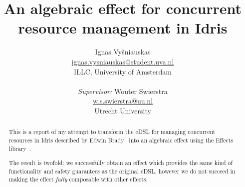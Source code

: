 \documentclass{article}
\title{An algebraic effect for concurrent resource management in Idris}
\author{Ignas Vyšniauskas \\ \url{ignas.vysniauskas@student.uva.nl} \\
        ILLC, University of Amsterdam \\
    \\ \textit{Supervisor:} Wouter Swierstra
    \\ \url{w.s.swierstra@uu.nl}
    \\ Utrecht University
}
\begin{document}
\maketitle

\begin{abstract}
    This is a report of my attempt to transform the eDSL for managing
    concurrent resources in Idris described by Edwin Brady~\cite{cbconc-fi}
    into an algebraic effect using the Effects library~\cite{effects-idr}.

    The result is twofold: we successfully obtain an effect which provides the
    same kind of functionality and safety guarantees as the original eDSL,
    however we do not succeed in making the effect \emph{fully} composable with
    other effects.
\end{abstract}









\end{document}

